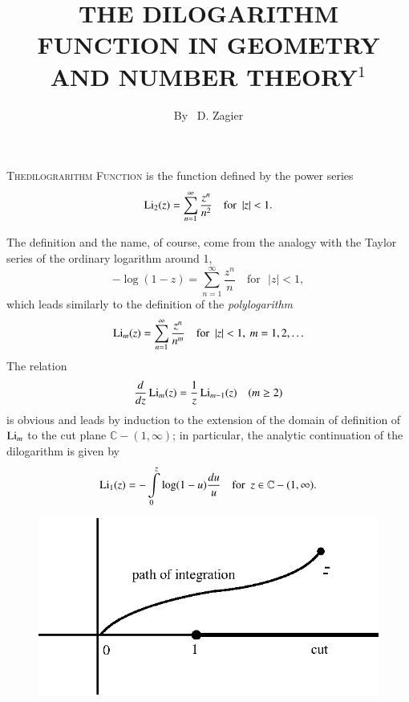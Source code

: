\title{THE DILOGARITHM FUNCTION IN GEOMETRY AND NUMBER THEORY$^{1}$}


\author{By~ D. Zagier}

\date{}
\maketitle

\setcounter{page}{274} 
\setcounter{pageoriginal}{230}
\textsc{The\pageoriginale dilograrithm Function} is the function defined by the power series
$$
\operatorname{Li}_{2}(z)=\sum\limits_{n=1}^{\infty} \frac{z^{n}}{n^{2}}\quad\text{for~ } |z|<1.
$$

The definition and the name, of course, come from the analogy with the Taylor series of the ordinary logarithm around 1,
$$
-\log (1-z)=\sum\limits^{\infty}_{n=1}\frac{z^{n}}{n}\quad\text{for~ } |z|<1,
$$
which leads similarly to the definition of the {\em polylogarithm}
$$
\operatorname{Li}_{m}(z)=\sum\limits^{\infty}_{n=1}\frac{z^{n}}{n^{m}}\quad\text{for~ } |z|<1, \ m=1,2,\ldots
$$
The relation
$$
\frac{d}{dz}\operatorname{Li}_{m}(z)=\frac{1}{z}\operatorname{Li}_{m-1}(z)\quad (m\geq 2)
$$
is obvious and leads by induction to the extension of the domain of definition of $\operatorname{Li}_{m}$ to the cut plane $\mathbb{C}-(1,\infty)$; in particular, the analytic continuation of the dilogarithm is given by
$$
\operatorname{Li}_{1}(z)=-\int\limits^{z}_{0}\log (1-u)\frac{du}{u}\quad\text{for~ } z\in \mathbb{C}-(1,\infty).
$$
\begin{figure}[H]
\centering
\includegraphics[scale=.9]{figures/fig1.eps}
\end{figure}

